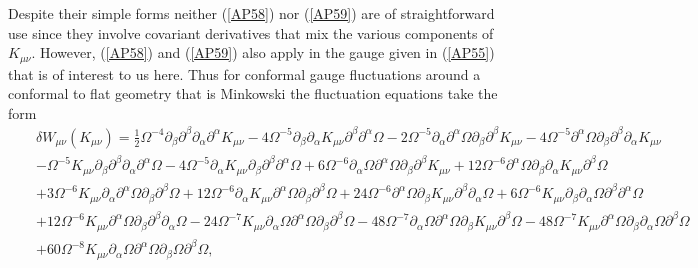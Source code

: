 \documentclass[aps]{revtex4}
\begin{document}
Despite their simple forms neither (\ref{AP58}) nor (\ref{AP59}) are of straightforward use since they involve covariant derivatives that mix the various components of $K_{\mu\nu}$. However, (\ref{AP58}) and (\ref{AP59}) also apply in the gauge given in (\ref{AP55}) that is of interest to us here. Thus for conformal gauge fluctuations around a conformal to flat geometry that is Minkowski the fluctuation equations take the form 
%
\begin{eqnarray}
&&\delta W_{\mu\nu}(K_{\mu\nu})=\frac{1}{2}\Omega^{-4}\partial_{\beta}\partial^{\beta}\partial_{\alpha}\partial^{\alpha}K_{\mu \nu}-  4\Omega^{-5} \partial_{\beta}\partial_{\alpha}K_{\mu \nu} \partial^{\beta}\partial^{\alpha}\Omega- 2\Omega^{-5}  \partial_{\alpha}\partial^{\alpha}\Omega \partial_{\beta}\partial^{\beta}K_{\mu \nu}-  4 \Omega^{-5}\partial^{\alpha}\Omega \partial_{\beta}\partial^{\beta}\partial_{\alpha}K_{\mu \nu}  
 \nonumber\\
 &&-  \Omega^{-5}K_{\mu \nu} \partial_{\beta}\partial^{\beta}\partial_{\alpha}\partial^{\alpha}\Omega -  4\Omega^{-5} \partial_{\alpha}K_{\mu \nu} \partial_{\beta}\partial^{\beta}\partial^{\alpha}\Omega 
 + 6\Omega^{-6} \partial_{\alpha}\Omega \partial^{\alpha}\Omega \partial_{\beta}\partial^{\beta}K_{\mu \nu} + 12\Omega^{-6} \partial^{\alpha}\Omega \partial_{\beta}\partial_{\alpha}K_{\mu \nu} \partial^{\beta}\Omega 
 \nonumber\\
 &&+ 3\Omega^{-6} K_{\mu \nu} \partial_{\alpha}\partial^{\alpha}\Omega \partial_{\beta}\partial^{\beta}\Omega + 12 \Omega^{-6}\partial_{\alpha}K_{\mu \nu} \partial^{\alpha}\Omega \partial_{\beta}\partial^{\beta}\Omega+ 24\Omega^{-6}  \partial^{\alpha}\Omega \partial_{\beta}K_{\mu \nu} \partial^{\beta}\partial_{\alpha}\Omega + 6\Omega^{-6} K_{\mu \nu} \partial_{\beta}\partial_{\alpha}\Omega \partial^{\beta}\partial^{\alpha}\Omega 
  \nonumber\\
 &&+ 12\Omega^{-6} K_{\mu \nu} \partial^{\alpha}\Omega \partial_{\beta}\partial^{\beta}\partial_{\alpha}\Omega -  24 \Omega^{-7}K_{\mu \nu} \partial_{\alpha}\Omega \partial^{\alpha}\Omega \partial_{\beta}\partial^{\beta}\Omega -  48\Omega^{-7}  \partial_{\alpha}\Omega \partial^{\alpha}\Omega \partial_{\beta}K_{\mu \nu} \partial^{\beta}\Omega-  48\Omega^{-7}  K_{\mu \nu} \partial^{\alpha}\Omega \partial_{\beta}\partial_{\alpha}\Omega \partial^{\beta}\Omega
  \nonumber\\
 &&+ 60\Omega^{-8} K_{\mu \nu} \partial_{\alpha}\Omega \partial^{\alpha}\Omega \partial_{\beta}\Omega \partial^{\beta}\Omega,
\label{AP60}
\end{eqnarray}
\end{document}

